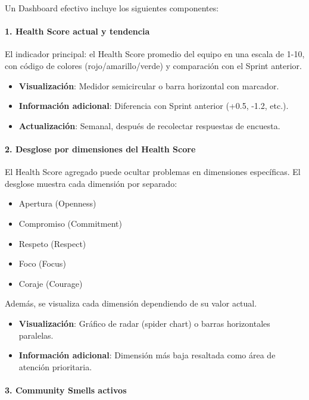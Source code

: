 Un Dashboard efectivo incluye los siguientes componentes:

\paragraph{1. Health Score actual y tendencia}

El indicador principal: el Health Score promedio del equipo en una escala de 1-10, con código de colores (rojo/amarillo/verde) y comparación con el Sprint anterior.

\begin{itemize}
    \item \textbf{Visualización}: Medidor semicircular o barra horizontal con marcador.
    \item \textbf{Información adicional}: Diferencia con Sprint anterior (+0.5, -1.2, etc.).
    \item \textbf{Actualización}: Semanal, después de recolectar respuestas de encuesta.
\end{itemize}

\paragraph{2. Desglose por dimensiones del Health Score}

El Health Score agregado puede ocultar problemas en dimensiones específicas. El desglose muestra cada dimensión por separado:

\begin{itemize}
    \item Apertura (Openness)
    \item Compromiso (Commitment)
    \item Respeto (Respect)
    \item Foco (Focus)
    \item Coraje (Courage)
\end{itemize}

Además, se visualiza cada dimensión dependiendo de su valor actual.

\begin{itemize}
    \item \textbf{Visualización}: Gráfico de radar (spider chart) o barras horizontales paralelas.
    \item \textbf{Información adicional}: Dimensión más baja resaltada como área de atención prioritaria.
\end{itemize}

\paragraph{3. Community Smells activos}

